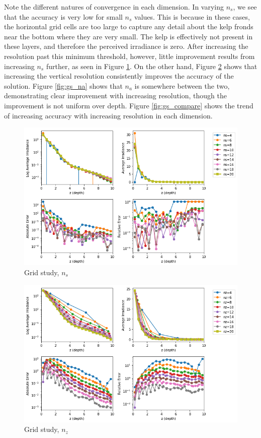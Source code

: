 \documentclass[ms,cpyr,lof,lot]{uathesis}
\begin{document}
Note the different natures of convergence in each dimension.
In varying $n_s$, we see that the accuracy is very low for small $n_s$ values.
This is because in these cases, the horizontal grid cells are too large to capture any detail
about the kelp fronds near the bottom where they are very small.
The kelp is effectively not present in these layers, and therefore the perceived irradiance is zero.
After increasing the resolution past this minimum threshold, however, little improvement results
from increasing $n_s$ further, as seen in Figure \ref{fig:gs_ns}.
On the other hand, Figure \ref{fig:gs_nz} shows that increasing the vertical resolution
consistently improves the accuracy of the solution.
Figure \ref{fig:gs_na} shows that $n_a$ is somewhere between the two,
demonstrating clear improvement with increasing resolution, though the improvement is not uniform over depth.
Figure \ref{fig:gs_compare} shows the trend of increasing accuracy with increasing resolution in each dimension.

\begin{figure}[H]
  \centering
  \includegraphics[width=5in]{gs_ns_20}
  \caption{Grid study, $n_s$}
  \label{fig:gs_ns}
\end{figure}

\begin{figure}[H]
  \centering
  \includegraphics[width=5in]{gs_nz_20}
  \caption{Grid study, $n_z$}
  \label{fig:gs_nz}
\end{figure}
\end{document}
